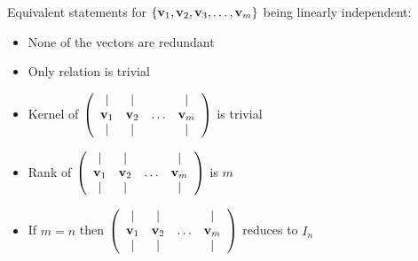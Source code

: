 \noindent
Equivalent statements for $\left\{\textbf{v}_{1}, \textbf{v}_{2}, \textbf{v}_{3}, \ldots, \textbf{v}_{m}\right\}$ being linearly independent:
\begin{itemize}
    \item None of the vectors are redundant
    \item Only relation is trivial
    \item Kernel of $\left(\begin{array}{cccc}
        \mid & \mid & & \mid \\
        \textbf{v}_{1} & \textbf{v}_{2} & \ldots & \textbf{v}_{m} \\
        \mid & \mid & & \mid
        \end{array}\right)$ is trivial
    \item Rank of $\left(\begin{array}{cccc}
        \mid & \mid & & \mid \\
        \textbf{v}_{1} & \textbf{v}_{2} & \ldots & \textbf{v}_{m} \\
        \mid & \mid & & \mid
        \end{array}\right)$ is $m$
    \item If $m=n$ then $\left(\begin{array}{cccc}
        \mid & \mid & & \mid \\
        \textbf{v}_{1} & \textbf{v}_{2} & \ldots & \textbf{v}_{m} \\
        \mid & \mid & & \mid
        \end{array}\right)$ reduces to $I_n$
\end{itemize}